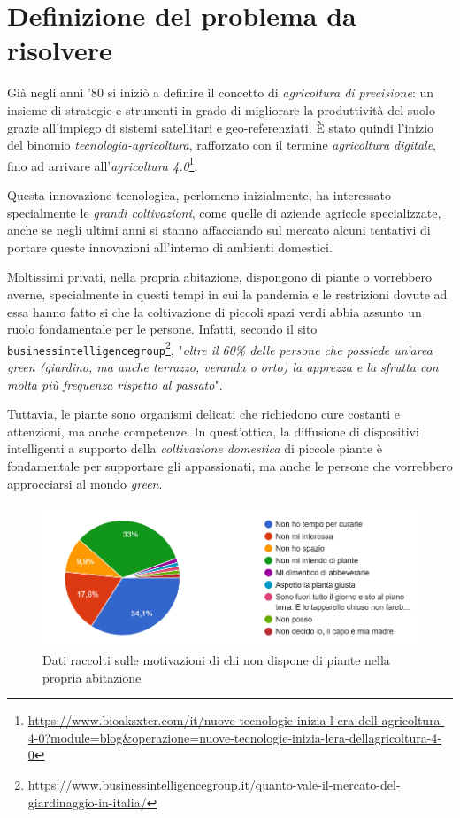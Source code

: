\section{Definizione del problema da risolvere}

Già negli anni '80 si iniziò a definire il concetto di \textit{agricoltura di precisione}: un insieme di strategie e strumenti in grado di migliorare la produttività del suolo grazie all'impiego di sistemi satellitari e geo-referenziati. \`E stato quindi l'inizio del binomio \textit{tecnologia-agricoltura}, rafforzato con il termine \textit{agricoltura digitale}, fino ad arrivare all'\textit{agricoltura 4.0}\footnote{\url{https://www.bioaksxter.com/it/nuove-tecnologie-inizia-l-era-dell-agricoltura-4-0?module=blog&operazione=nuove-tecnologie-inizia-lera-dellagricoltura-4-0}}.

Questa innovazione tecnologica, perlomeno inizialmente, ha interessato specialmente le \textit{grandi coltivazioni}, come quelle di aziende agricole specializzate, anche se negli ultimi anni si stanno affacciando sul mercato alcuni tentativi di portare queste innovazioni all'interno di ambienti domestici.

Moltissimi privati, nella propria abitazione, dispongono di piante o vorrebbero averne, specialmente in questi tempi in cui la pandemia e le restrizioni dovute ad essa hanno fatto si che la coltivazione di piccoli spazi verdi abbia assunto un ruolo fondamentale per le persone. Infatti, secondo il sito \texttt{businessintelligencegroup}\footnote{\url{https://www.businessintelligencegroup.it/quanto-vale-il-mercato-del-giardinaggio-in-italia/}}, "\textit{oltre il 60\% delle persone che possiede un’area green (giardino, ma anche terrazzo, veranda o orto) la apprezza e la sfrutta con molta più frequenza rispetto al passato}".

Tuttavia, le piante sono organismi delicati che richiedono cure costanti e attenzioni, ma anche competenze. In quest'ottica, la diffusione di dispositivi intelligenti a supporto della \textit{coltivazione domestica} di piccole piante è fondamentale per supportare gli appassionati, ma anche le persone che vorrebbero approcciarsi al mondo \textit{green}.

\begin{figure}[h!]
	\centering
	\includegraphics[width=\columnwidth]{images/torta_perche_no_piante.png}
	\caption{Dati raccolti sulle motivazioni di chi non dispone di piante nella propria abitazione}
	\label{fig:whynot}
\end{figure}

